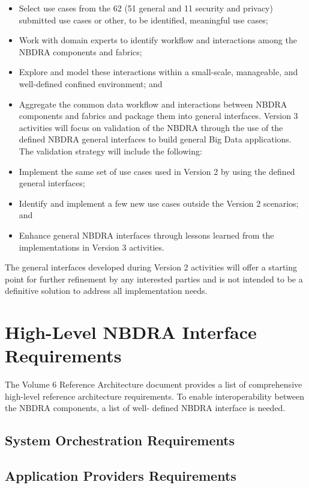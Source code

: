 \documentclass[11pt]{article}
\newcommand{\TODO}[1]{\todo[color=red!10]{#1}}
\begin{document}
\begin{itemize}
\item	Select use cases from the 62 (51 general and 11 security and privacy) submitted use cases or 
other, to be identified, meaningful use cases;
\item	Work with domain experts to identify workflow and interactions among the NBDRA 
components and fabrics;
\item	Explore and model these interactions within a small-scale, manageable, and well-defined 
confined environment; and 
\item	Aggregate the common data workflow and interactions between NBDRA components and 
fabrics and package them into general interfaces.
Version 3 activities will focus on validation of the NBDRA through the use of the defined NBDRA 
general interfaces to build general Big Data applications. The validation strategy will include the 
following:
\item	Implement the same set of use cases used in Version 2 by using the defined general interfaces;
\item	Identify and implement a few new use cases outside the Version 2 scenarios; and
\item	Enhance general NBDRA interfaces through lessons learned from the implementations in 
Version 3 activities.
\end{itemize}


The general interfaces developed during Version 2 activities will offer a starting point for further 
refinement by any interested parties and is not intended to be a definitive solution to address all 
implementation needs. 

\section{High-Level NBDRA Interface Requirements}
The Volume 6 Reference Architecture document provides a list of comprehensive high-level reference 
architecture requirements. To enable interoperability between the NBDRA components, a list of well-
defined NBDRA interface is needed.  

\subsection{System Orchestration Requirements}

\TODO{System Orchestration Requirements}

\subsection{Application Providers Requirements}
\end{document}
